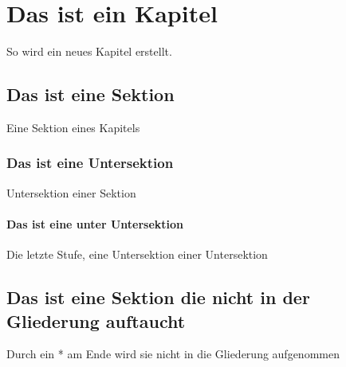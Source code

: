 \chapter{Das ist ein Kapitel}
So wird ein neues Kapitel erstellt.
\section{Das ist eine Sektion}
Eine Sektion eines Kapitels
\subsection{Das ist eine Untersektion}
Untersektion einer Sektion
\subsubsection{Das ist eine unter Untersektion}
Die letzte Stufe, eine Untersektion einer Untersektion
\section*{Das ist eine Sektion die nicht in der Gliederung auftaucht}
Durch ein * am Ende wird sie nicht in die Gliederung aufgenommen

